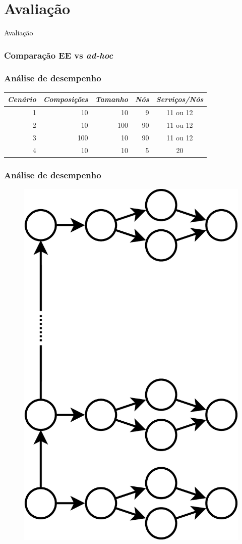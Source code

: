\documentclass{beamer}
\newcommand\adhoc{\emph{ad-hoc}}
\newcommand\sectiontitle[1]{\begin{center}\huge#1\end{center}}
\begin{document}

\section{Avaliação}

\begin{frame}

\sectiontitle{Avaliação}

\end{frame}



\begin{frame}
\frametitle{Comparação EE vs \adhoc}

\end{frame}



\begin{frame}
\frametitle{Análise de desempenho}

\begin{table}
\centering
\begin{tabular}{r r r r c} \hline
\emph{Cenário} & \emph{Composições} & \emph{Tamanho} & \emph{Nós} & \emph{Serviços/Nós} \\ \hline
1 &  10 &  10 &  9 & 11 ou 12 \\
2 &  10 & 100 & 90 & 11 ou 12 \\
3 & 100 &  10 & 90 & 11 ou 12 \\
4 &  10 &  10 &  5 &       20 \\
\hline \end{tabular}
\end{table}

\end{frame}



\begin{frame}
\frametitle{Análise de desempenho}

\begin{figure}
\includegraphics[width=0.4\linewidth, angle=270]{img/eval_composition}
\end{figure}

\end{frame}
\end{document}
